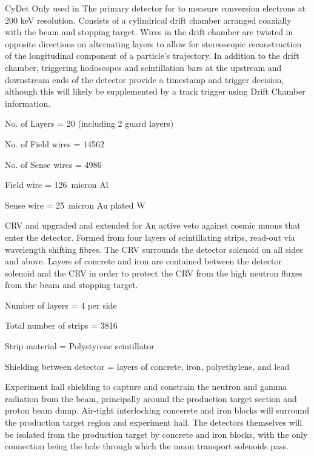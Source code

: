 {CyDet}
{}
{Only used in \phaseI}
{The primary detector for \phaseI to measure conversion electrons at 200 keV resolution.  Consists of a cylindrical drift chamber arranged coaxially with the beam and stopping target.  Wires in the drift chamber are twisted in opposite directions on alternating layers to allow for stereoscopic reconstruction of the longitudinal component of a particle's trajectory.  In addition to the drift chamber, triggering hodoscopes and scintillation bars at the upstream and downstream ends of the detector provide a timestamp and trigger decision, although this will likely be supplemented by a track trigger using Drift Chamber information.}
{\item No. of Layers = 20 (including 2 guard layers)
 \item No. of Field wires = 14562
 \item No. of Sense wires = 4986
 \item Field wire = 126~micron Al
 \item Sense wire = 25~micron Au plated W }

{CRV}
{}
{\phaseI and upgraded and extended for \phaseII }
{An active veto against cosmic muons that enter the detector.  Formed from four layers of scintillating strips, read-out via wavelength shifting fibres.  The CRV surrounds the detector solenoid on all sides and above.  Layers of concrete and iron are contained between the detector solenoid and the CRV in order to protect the CRV from the high neutron fluxes from the beam and stopping target. }
{\item Number of layers = 4 per side
 \item Total number of strips = 3816  
 \item Strip material = Polystyrene scintillator 
 \item Shielding between detector = layers of concrete, iron, polyethylene, and lead }

{}
{}
{\phaseI}
{Experiment hall shielding to capture and constrain the neutron and gamma radiation from the beam, principally around the production target section and proton beam dump.  Air-tight interlocking concerete and iron blocks will surround the production target region and experiment hall.  The detectors themselves will be isolated from the production target by concrete and iron blocks, with the only connection being the hole through which the muon transport solenoids pass. }
{}
